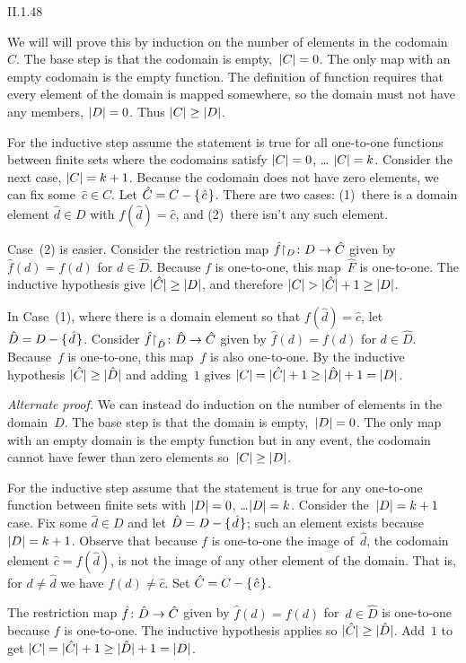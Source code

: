 \begin{ans}{II.1.48}
\begin{exparts}
\item
  We will will prove this by induction on the number of elements in
  the codomain~$C$.
  The base step is that the codomain is empty,~$\lvert C\rvert=0$.
  The only map with an empty codomain is the empty function.
  The definition of function requires that every element of the domain is
  mapped somewhere, so the domain must not have any members, $\lvert D\rvert=0$.
  Thus $\lvert C\rvert\geq \lvert D\rvert$.

  For the inductive step assume the statement is true for all one-to-one
  functions between finite sets where the codomains satisfy
  $\lvert C\rvert=0$, \ldots{} $\lvert C\rvert=k$.
  Consider the next case, $\lvert C\rvert=k+1$.
  Because the codomain does not have zero elements, we can
  fix some~$\hat{c}\in C$.
  Let $\hat{C}=C-\set{\hat{c}}$.
  There are two cases: (1)~there is
  a domain element $\hat{d}\in D$ with $f(\hat{d})=\hat{c}$,
  and (2)~there isn't any such element.

  Case~(2) is easier.
  Consider the restriction map
  $\mbox{${\hat{f}}\mathord\upharpoonright_{D}\colon D\to \hat{C}$}$ given by $\hat{f}(d)=f(d)$
  for $d\in\hat{D}$.
  Because $f$ is one-to-one, this map~$\hat{F}$ is one-to-one.
  The inductive hypothesis give $\lvert\hat{C}\rvert\geq \lvert D\rvert$, and therefore
  $\lvert C\rvert>\lvert\hat{C}\rvert+1\geq \lvert D\rvert$.

  In Case~(1), where there is a domain element so that $f(\hat{d})=\hat{c}$,
  let $\hat{D}=D-\set{\hat{d}}$.
  Consider $\mbox{${\hat{f}}\mathord\upharpoonright_{\hat{D}}\colon \hat{D}\to \hat{C}$}$ given by
  $\hat{f}(d)=f(d)$ for $d\in\hat{D}$.
  Because~$f$ is one-to-one, this map~$\hat{f}$ is also one-to-one.
  By the inductive hypothesis
  $\lvert\hat{C}\rvert\geq \lvert\hat{D}\rvert$ and adding~$1$ gives
  $\lvert C\rvert=\lvert\hat{C}\rvert+1\geq \lvert\hat{D}\rvert+1=\lvert D\rvert$.

  \smallskip
  \noindent\textit{Alternate proof.}
  We can instead do induction on the number of elements in the domain~$D$.
  The base step is that the domain is empty,~$\lvert D\rvert=0$.
  The only map with an empty domain is the empty function but in any event,
  the codomain cannot have fewer than zero elements
  so~$\lvert C\rvert\geq \lvert D\rvert$.

  For the inductive step assume that the statement is true
  for any one-to-one function between finite sets with $\lvert D\rvert=0$,
  \ldots $\lvert D\rvert=k$.
  Consider the~$\lvert D\rvert=k+1$ case.
  Fix some $\hat{d}\in D$ and let
  $\hat{D}=D-\set{\hat{d}}$; such an element exists because $\lvert D\rvert=k+1$.
  Observe that because $f$ is one-to-one the image of~$\hat{d}$,
  the codomain element $\hat{c}=f(\hat{d})$,
  is not the image of any other element of the domain.
  That is, for $d\neq \hat{d}$ we have $f(d)\neq\hat{c}$.
  Set $\hat{C}=C-\set{\hat{c}}$.

  The restriction map
  $\mbox{$\hat{f}\colon \hat{D}\to \hat{C}$}$
  given by $\hat{f}(d)=f(d)$ for~$d\in\hat{D}$
  is one-to-one because $f$ is one-to-one.
  The inductive hypothesis applies so
  $\lvert\hat{C}\rvert\geq \lvert\hat{D}\rvert$.
  Add~$1$ to get
  $\lvert C\rvert=\lvert\hat{C}\rvert+1\geq \lvert\hat{D}\rvert+1=\lvert D\rvert$.
\end{exparts}
\end{ans}
